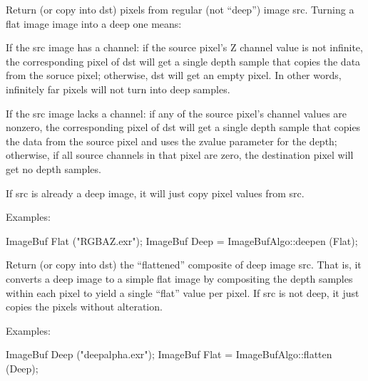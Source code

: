   
Return (or copy into {\cf dst}) pixels from regular (not ``deep'') image {\cf src}.
Turning a flat image image into a deep one means:

If the {\cf src} image has a  channel: if the source pixel's {\cf Z}
channel value is not infinite, the corresponding pixel of {\cf dst} will get
a single depth sample that copies the data from the soruce pixel; otherwise,
{\cf dst} will get an empty pixel. In other words, infinitely far pixels
will not turn into deep samples.

If the {\cf src} image lacks a  channel: if any of the source pixel's
channel values are nonzero, the corresponding pixel of {\cf dst} will get a
single depth sample that copies the data from the source pixel and uses the
{\cf zvalue} parameter for the depth; otherwise, if all source channels in
that pixel are zero, the destination pixel will get no depth samples.

If {\cf src} is already a deep image, it will just copy pixel values from
{\cf src}.

\smallskip
\noindent Examples:
\begin{code}
    ImageBuf Flat ("RGBAZ.exr");
    ImageBuf Deep = ImageBufAlgo::deepen (Flat);
\end{code}
\apiend

  
Return (or copy into {\cf dst}) the ``flattened'' composite of deep image
{\cf src}. That is, it converts a deep image to a simple flat image by
compositing the depth samples within each pixel to yield a single ``flat''
value per pixel. If {\cf src} is not deep, it just copies the pixels without
alteration.

\smallskip
\noindent Examples:
\begin{code}
    ImageBuf Deep ("deepalpha.exr");
    ImageBuf Flat = ImageBufAlgo::flatten (Deep);
\end{code}
\apiend

